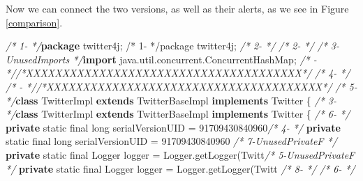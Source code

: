 \documentclass[
]{article}
\newenvironment{Shaded}{\begin{snugshade}}{\end{snugshade}}
\newcommand{\BuiltInTok}[1]{#1}
\newcommand{\CommentTok}[1]{\textcolor[rgb]{0.56,0.35,0.01}{\textit{#1}}}
\newcommand{\DataTypeTok}[1]{\textcolor[rgb]{0.13,0.29,0.53}{#1}}
\newcommand{\DecValTok}[1]{\textcolor[rgb]{0.00,0.00,0.81}{#1}}
\newcommand{\FunctionTok}[1]{\textcolor[rgb]{0.00,0.00,0.00}{#1}}
\newcommand{\ImportTok}[1]{#1}
\newcommand{\KeywordTok}[1]{\textcolor[rgb]{0.13,0.29,0.53}{\textbf{#1}}}
\newcommand{\NormalTok}[1]{#1}
\begin{document}
\normalsize

\newpage

\begin{landscape}

Now we can connect the two versions, as well as their alerts, as we see
in Figure \ref{comparison}.

\scriptsize

\begin{Shaded}
\begin{Highlighting}[]
\CommentTok{/*  1-                 */}\KeywordTok{package}\ImportTok{ twitter4j;                                             /*  1-                 */package twitter4j;}                                             
\CommentTok{/*  2-                 */}                                                               \CommentTok{/*  2-                 */}                                                               
\CommentTok{/*  3-UnusedImports    */}\KeywordTok{import}\ImportTok{ java.util.concurrent.ConcurrentHashMap;}                 \CommentTok{/*   -                 *//*XXXXXXXXXXXXXXXXXXXXXXXXXXXXXXXXXXXXXX*/}                     
\CommentTok{/*  4-                 */}                                                               \CommentTok{/*   -                 *//*XXXXXXXXXXXXXXXXXXXXXXXXXXXXXXXXXXXXXX*/}                     
\CommentTok{/*  5-                 */}\KeywordTok{class}\NormalTok{ TwitterImpl }\KeywordTok{extends}\NormalTok{ TwitterBaseImpl }\KeywordTok{implements}\NormalTok{ Twitter \{ }\CommentTok{/*  3-                 */}\KeywordTok{class}\NormalTok{ TwitterImpl }\KeywordTok{extends}\NormalTok{ TwitterBaseImpl }\KeywordTok{implements}\NormalTok{ Twitter \{ }
\CommentTok{/*  6-                 */}    \KeywordTok{private} \DataTypeTok{static} \DataTypeTok{final} \DataTypeTok{long}\NormalTok{ serialVersionUID = }\DecValTok{91709430840960}\CommentTok{/*  4-                 */}    \KeywordTok{private} \DataTypeTok{static} \DataTypeTok{final} \DataTypeTok{long}\NormalTok{ serialVersionUID = }\DecValTok{91709430840960}
\CommentTok{/*  7-UnusedPrivateF   */}    \KeywordTok{private} \DataTypeTok{static} \DataTypeTok{final} \BuiltInTok{Logger}\NormalTok{ logger = }\BuiltInTok{Logger}\NormalTok{.}\FunctionTok{getLogger}\NormalTok{(Twitt}\CommentTok{/*  5-UnusedPrivateF   */}    \KeywordTok{private} \DataTypeTok{static} \DataTypeTok{final} \BuiltInTok{Logger}\NormalTok{ logger = }\BuiltInTok{Logger}\NormalTok{.}\FunctionTok{getLogger}\NormalTok{(Twitt}
\CommentTok{/*  8-                 */}                                                               \CommentTok{/*  6-                 */}                                                               

\end{Highlighting}
\end{Shaded}
\end{landscape}
\end{document}
